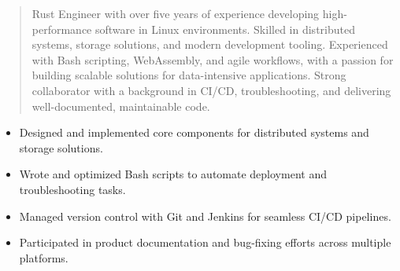 



\makecvheader

\begin{quote}
  \noindent
  Rust Engineer with over five years of experience developing high-performance software in Linux environments. Skilled in distributed systems, storage solutions, and modern development tooling. Experienced with Bash scripting, WebAssembly, and agile workflows, with a passion for building scalable solutions for data-intensive applications. Strong collaborator with a background in CI/CD, troubleshooting, and delivering well-documented, maintainable code.
\end{quote}

\par\smallskip
\noindent
\begin{minipage}{20cm}
  \begin{minipage}{9.75cm}
    \begin{itemize}
      \item Designed and implemented core components for distributed systems and storage solutions.
      \item Wrote and optimized Bash scripts to automate deployment and troubleshooting tasks.
    \end{itemize}
  \end{minipage}
  \hfill
  \begin{minipage}{9.75cm}
    \begin{itemize}
      \item Managed version control with Git and Jenkins for seamless CI/CD pipelines.
      \item Participated in product documentation and bug-fixing efforts across multiple platforms.
    \end{itemize}
  \end{minipage}
\end{minipage}
\par\smallskip
\divider

